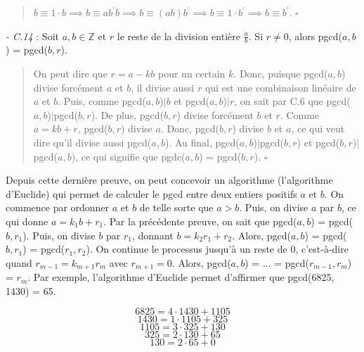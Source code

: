 \begin{quote}
    $b \equiv 1 \cdot b  \implies b \equiv ab^{'}b \implies b \equiv (ab)b^{'}  \implies b \equiv 1 \cdot b^{'} \implies b \equiv b^{'}$. $\square$ 
\end{quote}

\textit{- C.14} : Soit $a,b \in \mathbb{Z}$ et $r$ le reste de la division entière $\frac{a}{b}$. Si $r\not= 0$, alors pgcd($a,b$) = pgcd($b,r$).

\begin{quote}
    On peut dire que $r = a - kb$ pour un certain $k$. Donc, puisque pgcd($a,b$) divise forcément $a$ et $b$, il divise aussi $r$ qui est une combinaison linéaire de $a$ et $b$. Puis, comme pgcd($a,b$)$|b$ et pgcd($a,b$)$|r$, on sait par C.6 que pgcd($a,b$)$|$pgcd($b,r$). De plus, pgcd($b,r$) divise forcément $b$ et $r$. Comme $a = kb + r$, pgcd($b,r$) divise $a$. Donc, pgcd($b,r$) divise $b$ et $a$, ce qui veut dire qu'il divise aussi pgcd($a,b$). Au final, pgcd($a,b$)$|$pgcd($b,r$) et pgcd($b,r$)$|$pgcd($a,b$), ce qui signifie que pgdc($a,b$) = pgcd($b,r$). $\square$
\end{quote}

Depuis cette dernière preuve, on peut concevoir un algorithme (l'algorithme d'Euclide) qui permet de calculer le pgcd entre deux entiers positifs $a$ et $b$. On commence par ordonner $a$ et $b$ de telle sorte que $a > b$. Puis, on divise $a$ par $b$, ce qui donne $a = k_1b + r_1$. Par la précédente preuve, on sait que pgcd($a,b$) = pgcd($b,r_1$). Puis, on divise $b$ par $r_1$, donnant $b = k_2 r_1 + r_2$. Alors, pgcd($a,b$) = pgcd($b,r_1$) = pgcd($r_1, r_2$). On continue le processus jusqu'à un reste de 0, c'est-à-dire quand $r_{m-1} = k_{m+1}r_m$ avec $r_{m+1} = 0$. Alors, pgcd($a,b$) = ... = pgcd($r_{m-1}, r_m$) = $r_m$. Par exemple, l'algorithme d'Euclide permet d'affirmer que pgcd(6825, 1430) = 65.

\begin{equation*}
    6825 = 4 \cdot 1430 + 1105
\end{equation*}
\begin{equation*}
    1430 = 1 \cdot 1105 + 325
\end{equation*}
\begin{equation*}
    1105 = 3 \cdot 325 + 130
\end{equation*}
\begin{equation*}
    325 = 2 \cdot 130 + 65
\end{equation*}
\begin{equation*}
    130 = 2 \cdot 65 + 0
\end{equation*}

